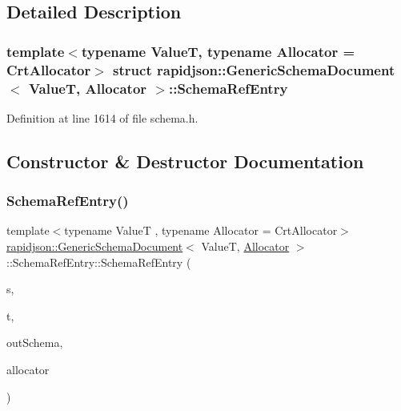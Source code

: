 \subsection{Detailed Description}
\subsubsection*{template$<$typename ValueT, typename Allocator = Crt\+Allocator$>$\newline
struct rapidjson\+::\+Generic\+Schema\+Document$<$ Value\+T, Allocator $>$\+::\+Schema\+Ref\+Entry}



Definition at line 1614 of file schema.\+h.



\subsection{Constructor \& Destructor Documentation}
\mbox{\label{structrapidjson_1_1_generic_schema_document_1_1_schema_ref_entry_a47bc798a3df32a81ee18ca996a989c84}} 
\subsubsection{\texorpdfstring{SchemaRefEntry()}{SchemaRefEntry()}}
{\footnotesize\ttfamily template$<$typename ValueT , typename Allocator  = Crt\+Allocator$>$ \\
\mbox{\hyperlink{classrapidjson_1_1_generic_schema_document}{rapidjson\+::\+Generic\+Schema\+Document}}$<$ ValueT, \mbox{\hyperlink{classrapidjson_1_1_allocator}{Allocator}} $>$\+::Schema\+Ref\+Entry\+::\+Schema\+Ref\+Entry (\begin{DoxyParamCaption}\item[{const \mbox{\hyperlink{classrapidjson_1_1_generic_schema_document_a61540c0f8aa542760ae03257a0e6dab7}{Pointer\+Type}} \&}]{s,  }\item[{const \mbox{\hyperlink{classrapidjson_1_1_generic_schema_document_a61540c0f8aa542760ae03257a0e6dab7}{Pointer\+Type}} \&}]{t,  }\item[{const \mbox{\hyperlink{classrapidjson_1_1_generic_schema_document_aaf4e7f371de938025f7ed4be3b83266e}{Schema\+Type}} $\ast$$\ast$}]{out\+Schema,  }\item[{\mbox{\hyperlink{classrapidjson_1_1_allocator}{Allocator}} $\ast$}]{allocator }\end{DoxyParamCaption})}




